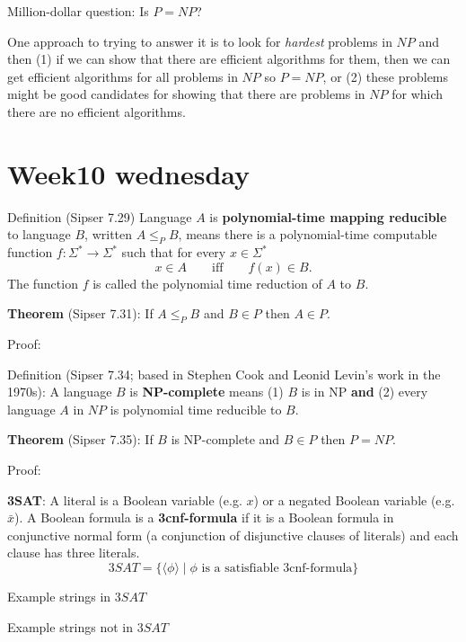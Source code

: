\documentclass[12pt, oneside]{article}
\begin{document}
Million-dollar question: Is $P = NP$?


One approach to trying to answer it is to look for {\it hardest} problems in $NP$ and 
then (1) if we can show that there are efficient algorithms for them, then we can get 
efficient algorithms for all problems in $NP$ so $P = NP$, or (2) these problems might 
be good candidates for showing that there are problems in $NP$ for which there 
are no efficient algorithms.

\vfill
\newpage
 \vfill
\section*{Week10 wednesday}



Definition (Sipser 7.29) Language  $A$ is {\bf polynomial-time mapping reducible} to language $B$, written $A \leq_P B$,
means there is a polynomial-time computable function $f: \Sigma^* \to \Sigma^*$  such that for every $x \in \Sigma^*$
\[
x \in A \qquad \text{iff} \qquad f(x) \in B.
\]
The  function $f$ is  called the  polynomial time reduction of $A$ to $B$.

{\bf  Theorem}  (Sipser 7.31):  If $A \leq_P B$ and $B  \in P$ then $A \in P$.

Proof: 

\vfill

Definition (Sipser 7.34; based in Stephen Cook and Leonid Levin's work in the 1970s): 
A language $B$ is {\bf  NP-complete} means (1) $B$ is in NP {\bf and}  (2) every language
$A$ in $NP$ is polynomial time reducible to $B$.

{\bf  Theorem}  (Sipser 7.35):  If $B$ is NP-complete and $B \in P$ then $P = NP$.

Proof: 

\vfill

\newpage

{\bf 3SAT}: A literal is a Boolean variable (e.g.  $x$) or a negated Boolean variable (e.g.  $\bar{x}$).  
A Boolean formula is a {\bf  3cnf-formula} if it is a Boolean formula in conjunctive normal form (a conjunction  
of  disjunctive clauses of literals) and each clause  has  three literals.
\[
3SAT  = \{  \langle  \phi \rangle \mid \text{$\phi$ is  a  satisfiable 3cnf-formula} \}
\]


Example strings  in $3SAT$
\vfill



Example  strings not  in $3SAT$

\vfill
\end{document}
